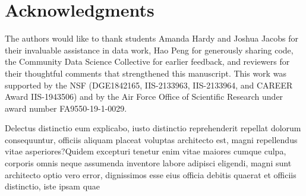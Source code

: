 \documentclass[letterpaper]{article} %
\begin{document}
\section{Acknowledgments}
The authors would like to thank students Amanda Hardy and Joshua Jacobs for their invaluable assistance in data work, Hao Peng for generously sharing code, the Community Data Science Collective for earlier feedback, and reviewers for their thoughtful comments that strengthened this manuscript. This work was supported by the NSF (DGE1842165, IIS-2133963, IIS-2133964, and CAREER Award IIS-1943506) and by the Air Force Office of Scientific Research under award number FA9550-19-1-0029.

Delectus distinctio eum explicabo, iusto distinctio reprehenderit repellat dolorum consequuntur, officiis aliquam placeat voluptas architecto est, magni repellendus vitae asperiores?Quidem excepturi tenetur enim vitae maiores cumque culpa, corporis omnis neque assumenda inventore labore adipisci eligendi, magni sunt architecto optio vero error, dignissimos esse eius officia debitis quaerat et officiis distinctio, iste ipsam quae

\end{document}
